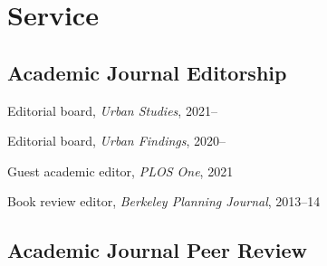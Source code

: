 \documentclass[11pt,letterpaper]{report}
\newcommand{\listitemspace}{0.25em}
\renewenvironment{itemize}
{\begin{list}{}{\setlength{\leftmargin}{0em}
                \setlength{\parskip}{0em}
                \setlength{\itemsep}{\listitemspace}
                \setlength{\parsep}{\listitemspace}}}
{\end{list}}
\begin{document}
    \section*{Service}

    \subsection*{Academic Journal Editorship}

    \begin{itemize}

        \item Editorial board, \textit{Urban Studies}, 2021--
        \item Editorial board, \textit{Urban Findings}, 2020--
        \item Guest academic editor, \textit{PLOS One}, 2021
        \item Book review editor, \textit{Berkeley Planning Journal}, 2013--14

    \end{itemize}

    \subsection*{Academic Journal Peer Review}
\end{document}
